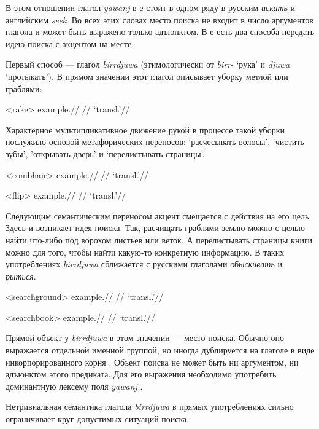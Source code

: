 В этом отношении глагол \textit{yawanj} в  е стоит в одном ряду в русским \textit{искать} и английским \textit{seek}. Во всех этих словах место поиска не входит в число аргументов глагола и может быть выражено только адъюнктом. В  е есть два способа передать идею поиска с акцентом на месте. 

Первый способ --- глагол \textit{birrdjuwa} (этимологически от \textit{birr}- `рука' и \textit{djuwa} `протыкать'). В прямом значении этот глагол описывает уборку метлой или граблями:

\ex<rake>\begingl
\gla example.//
\glb //
\glft `transl.'\trailingcitation{[src]}//
\endgl\xe

Характерное мультипликативное движение рукой в процессе такой уборки послужило основой метафорических переносов: `расчесывать волосы', `чистить зубы', 'открывать дверь' и `перелистывать страницы'.

\ex<combhair>\begingl
\gla example.//
\glb //
\glft `transl.'\trailingcitation{[src]}//
\endgl\xe

\ex<flip>\begingl
\gla example.//
\glb //
\glft `transl.'\trailingcitation{[src]}//
\endgl\xe

Следующим семантическим переносом акцент смещается с действия на его цель. Здесь и возникает идея поиска. Так, расчищать граблями землю можно с целью  найти что-либо под ворохом листьев или веток. А перелистывать страницы книги можно для того, чтобы найти какую-то конкретную информацию. В таких употреблениях \textit{birrdjuwa} сближается с русскими глаголами \textit{обыскивать} и \textit{рыться}.

\ex<searchground>\begingl
\gla example.//
\glb //
\glft `transl.'\trailingcitation{[src]}//
\endgl\xe

\ex<searchbook>\begingl
\gla example.//
\glb //
\glft `transl.'\trailingcitation{[src]}//
\endgl\xe

Прямой объект у \textit{birrdjuwa} в этом значении --- место поиска. Обычно оно выражается отдельной именной группой, но иногда дублируется на глаголе в виде инкорпорированного корня . Объект поиска не может быть ни аргументом, ни адъюнктом этого предиката. Для его выражения необходимо употребить доминантную лексему поля \textit{yawanj} .

Нетривиальная семантика глагола \textit{birrdjuwa} в прямых употреблениях сильно ограничивает круг допустимых ситуаций поиска. 




